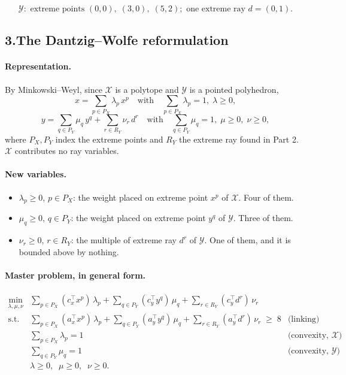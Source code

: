 \documentclass[11pt]{article}
\DeclareMathOperator*{\minimize}{min}
\theoremstyle{definition}
\theoremstyle{plain}
\begin{document}
\[
  \boxed{\;
  \mathcal{Y}: \text{ extreme points }
    (0,0),\;(3,0),\;(5,2);
    \text{ one extreme ray } d = (0,1). \;}
\]

\subsection*{3.\quad The Dantzig--Wolfe reformulation}

\paragraph{Representation.} By Minkowski--Weyl, since $\mathcal{X}$ is a
polytope and $\mathcal{Y}$ is a pointed polyhedron,
\[
  x = \sum_{p \in P_X} \lambda_p\, x^p
  \quad\text{with}\quad \sum_{p \in P_X} \lambda_p = 1,\;\lambda \ge 0,
\]
\[
  y = \sum_{q \in P_Y} \mu_q\, y^q
      + \sum_{r \in R_Y} \nu_r\, d^r
  \quad\text{with}\quad \sum_{q \in P_Y} \mu_q = 1,\;
  \mu \ge 0,\; \nu \ge 0,
\]
where $P_X, P_Y$ index the extreme points and $R_Y$ the extreme ray
found in Part 2. $\mathcal{X}$ contributes no ray variables.

\paragraph{New variables.}
\begin{itemize}
  \item $\lambda_p \ge 0$, $p \in P_X$: the weight placed on extreme
        point $x^p$ of $\mathcal{X}$. Four of them.
  \item $\mu_q \ge 0$, $q \in P_Y$: the weight placed on extreme point
        $y^q$ of $\mathcal{Y}$. Three of them.
  \item $\nu_r \ge 0$, $r \in R_Y$: the multiple of extreme ray $d^r$ of
        $\mathcal{Y}$. One of them, and it is bounded above by nothing.
\end{itemize}

\paragraph{Master problem, in general form.}
\[
\begin{array}{llr}
  \minimize\limits_{\lambda,\mu,\nu} &
    \displaystyle \sum_{p \in P_X} (c_x^{\!\top} x^p)\,\lambda_p
    + \sum_{q \in P_Y} (c_y^{\!\top} y^q)\,\mu_q
    + \sum_{r \in R_Y} (c_y^{\!\top} d^r)\,\nu_r & \\[12pt]
  \text{s.t.} &
    \displaystyle \sum_{p \in P_X} (a_x^{\!\top} x^p)\,\lambda_p
    + \sum_{q \in P_Y} (a_y^{\!\top} y^q)\,\mu_q
    + \sum_{r \in R_Y} (a_y^{\!\top} d^r)\,\nu_r \;\ge\; 8
      & \text{(linking)} \\[12pt]
  & \displaystyle \sum_{p \in P_X} \lambda_p = 1
      & \text{(convexity, } \mathcal{X}) \\[10pt]
  & \displaystyle \sum_{q \in P_Y} \mu_q = 1
      & \text{(convexity, } \mathcal{Y}) \\[8pt]
  & \lambda \ge 0,\;\; \mu \ge 0,\;\; \nu \ge 0 . &
\end{array}
\]
\end{document}
